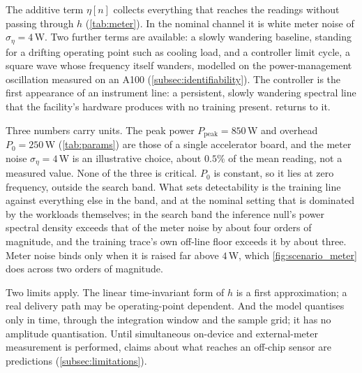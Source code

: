 \documentclass{article}
\begin{document}
The additive term $\eta[n]$ collects everything that reaches the readings
without passing through $h$ (\cref{tab:meter}). In the nominal channel it is
white meter noise of $\sigma_\eta = 4$\,W. Two further terms are available: a
slowly wandering baseline, standing for a drifting operating point such as
cooling load, and a controller limit cycle, a square wave whose frequency
itself wanders, modelled on the power-management oscillation measured on an
A100 (\cref{subsec:identifiability}). The controller is the first appearance of an
instrument line: a persistent, slowly wandering spectral line that the
facility's hardware produces with no training present.
 returns to it.

Three numbers carry units. The peak power $P_{\mathrm{peak}} = 850$\,W and
overhead $P_0 = 250$\,W (\cref{tab:params}) are those of a single accelerator
board, and the meter noise $\sigma_\eta = 4$\,W is an illustrative choice,
about $0.5\%$ of the mean reading, not a measured value. None of the three is
critical. $P_0$ is constant, so it lies at zero frequency, outside the search
band. What sets detectability is the training line against everything else in
the band, and at the nominal setting that is dominated by the workloads
themselves; in the search band the inference null's power spectral density
exceeds that of the meter noise by about four orders of magnitude, and the
training trace's own off-line floor exceeds it by about three. Meter noise
binds only when it is raised far above $4$\,W, which
\cref{fig:scenario_meter} does across two orders of magnitude.


Two limits apply. The linear time-invariant form of $h$ is a first
approximation; a real delivery path may be operating-point dependent. And the
model quantises only in time, through the integration window and the sample
grid; it has no amplitude quantisation. Until simultaneous on-device and
external-meter measurement is performed, claims about what reaches an
off-chip sensor are predictions (\cref{subsec:limitations}).
\end{document}
